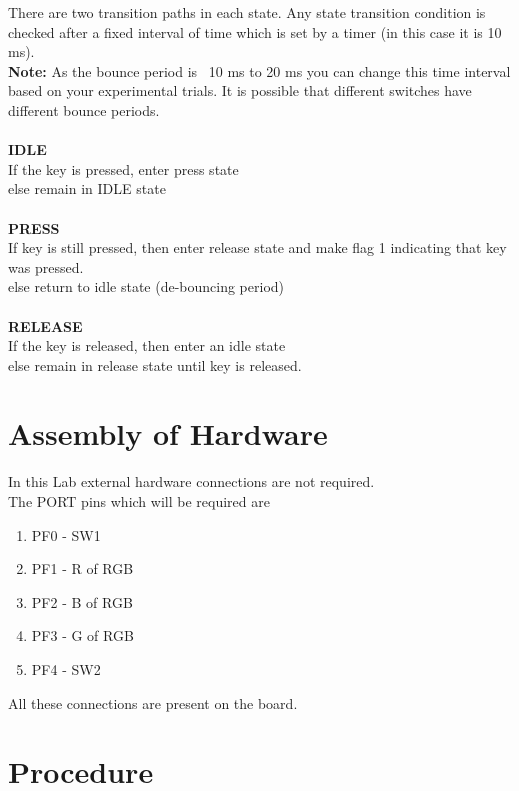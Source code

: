 \documentclass[a4paper,12pt,oneside]{book}
\begin{document}
There are two transition paths in each state. Any state transition condition is checked after a fixed interval
of time which is set by a timer (in this case it is 10 ms).
\\
\textbf{Note:} As the bounce period is ~10 ms to 20 ms you can change this time interval based on your experimental
trials. It is possible that different switches have different bounce periods.
\\
\\
\textbf{IDLE} \\
If the key is pressed, enter press state\\
else remain in IDLE state
\\
\\
\textbf{PRESS} \\
If key is still pressed, then enter release state and make flag 1 indicating that key was pressed.\\
else return to idle state (de-bouncing period)
\\
\\
\textbf{RELEASE} \\
If the key is released, then enter an idle state\\
else remain in release state until key is released.


\section{Assembly of Hardware}
In this Lab external hardware connections are not required.\\
The PORT pins which will be required are 
\begin{enumerate}
\item PF0 - SW1
\item PF1 - R of RGB
\item PF2 - B of RGB
\item PF3 - G of RGB
\item PF4 - SW2
\end{enumerate}
All these connections are present on the board.


\section {Procedure}
\end{document}
